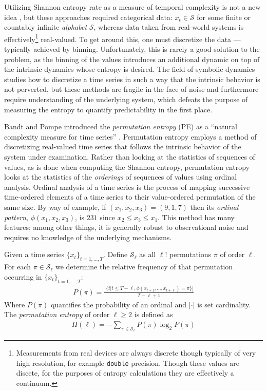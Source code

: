 Utilizing Shannon entropy rate as a measure of temporal complexity is not a new idea \cite{Shannon1951, mantegna1994linguistic}, but these approaches required categorical data: $x_t \in \mathcal{S}$ for some finite or countably infinite \emph{alphabet} $\mathcal{S}$, whereas data taken from real-world systems is effectively\footnote{Measurements from real devices are always discrete though typically of very high resolution, for example \texttt{double} precision. Though these values are discete, for the purposes of entropy calculations they are effectively a continuum.} real-valued.  To get around this, one must discretize the data --- typically achieved by binning.  Unfortunately, this is rarely a good solution to the problem, as the binning of the values introduces an additional dynamic on top of the intrinsic dynamics whose entropy is desired\cite{bollt2001}. The field of symbolic dynamics studies how to discretize a time series in such a way that the intrinsic behavior is not perverted, but these methods are fragile in the face of noise and furthermore require understanding of the underlying system, which defeats the purpose of measuring the entropy to quantify predictability in the first place.

Bandt and Pompe introduced the \emph{permutation entropy} (PE) as a ``natural complexity measure for time series'' \cite{bandt2002per}. Permutation entropy employs a method of discretizing real-valued time series that follows the intrinsic behavior of the system under examination.  Rather than looking at the statistics of sequences of values, as is done when computing the Shannon entropy, permutation entropy looks at the statistics of the \emph{orderings} of sequences of values using ordinal analysis. Ordinal analysis of a time series is the process of mapping successive time-ordered elements of a time series to their value-ordered permutation of the same size.  By way of example, if $(x_1, x_2, x_3) = (9, 1, 7)$ then its \emph{ordinal pattern}, $\phi(x_1, x_2, x_3)$, is $231$ since $x_2 \leq x_3 \leq x_1$.  This method has many features; among other things, it is generally robust to observational noise and requires no knowledge of the underlying mechanisms.

\begin{mydef}

  Given a time series $\{x_t\}_{t = 1,\dots,T}$. Define $\mathcal{S}_\ell$ as all $\ell!$ permutations $\pi$ of order $\ell$. For each $\pi \in \mathcal{S}_\ell$ we determine the relative frequency of that permutation occurring in $\{x_t\}_{t = 1,\dots,T}$:
  \begin{align*}
    P(\pi) = \frac{\left|\{t|t \leq T-\ell,\phi(x_{t+1},\dots,x_{t+\ell}) = \pi\}\right|}{T-\ell+1}
  \end{align*}
  Where $P(\pi)$ quantifies the probability of an ordinal and $|\cdot|$ is set cardinality. The \emph{permutation entropy} of order $\ell \ge 2$ is defined as
  \begin{align*}
    H(\ell) = - \sum_{\pi \in \mathcal{S}_\ell} P(\pi) \log_2 P(\pi)
  \end{align*}

\end{mydef}

